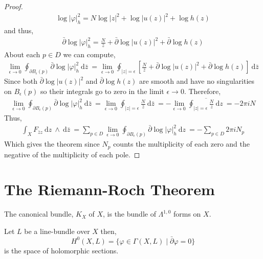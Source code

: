 \documentclass[12pt]{extarticle}
\renewcommand{\d}[1]{\: \mathrm{d}#1 \:}
\theoremstyle{definition}
\newenvironment{definition}[1][Definition:]{\begin{trivlist}
\item[\hskip \labelsep {\bfseries #1}]}{\end{trivlist}}
\begin{document}
\begin{proof}
\begin{align*}
\log{|\varphi|_h^2} = N \log{|z|^2} + \log{|u(z)|^2} + \log{h(z)} 
\end{align*}
and thus,
\begin{align*}
\bar{\partial} \log{|\varphi|_h^2} = \frac{N}{\bar{z}} + \bar{\partial} \log{|u(z)|^2} + \bar{\partial} \log{h(z)} 
\end{align*}
About each $p \in D$ we can compute,
\begin{align*}
\lim_{\epsilon \to 0} \oint_{\partial B_{\epsilon}(p)} \bar{\partial} \log{|\varphi|_h^2} \d{\bar{z}} = \lim_{\epsilon \to 0} \oint_{|z| = \epsilon} \left[ \frac{N}{\bar{z}} + \bar{\partial} \log{|u(z)|^2} + \bar{\partial} \log{h(z)} \right] \d{\bar{z}}
\end{align*}
Since both $\bar{\partial} \log{|u(z)|^2}$ and $\bar{\partial} \log{h(z)}$ are smooth and have no singularities on $B_{\epsilon}(p)$ so their integrals go to zero in the limit $\epsilon \to 0$. Therefore,
\begin{align*}
\lim_{\epsilon \to 0} \oint_{\partial B_{\epsilon}(p)} \bar{\partial} \log{|\varphi|_h^2} \d{\bar{z}} = \lim_{\epsilon \to 0} \oint_{|z| = \epsilon} \frac{N}{\bar{z}} \d{\bar{z}} = -\lim_{\epsilon \to 0} \overline{\oint_{|z| = \epsilon} \frac{N}{z} \d{z} } = - 2 \pi i N
\end{align*}
Thus,
\begin{align*}
\int_X F_{\bar{z} z} \d{z} \wedge \d{\bar{z}} = \sum_{p \in D} \lim_{\epsilon \to 0} \oint_{\partial B_{\epsilon}(p)} \bar{\partial} \log{|\varphi|_h^2} \d{z}  = - \sum_{p \in D} 2 \pi i N_p
\end{align*}
Which gives the theorem since $N_p$ counts the multiplicity of each zero and the negative of the multiplicity of each pole. 
\end{proof}

\section{The Riemann-Roch Theorem}

\begin{definition}
The canonical bundle, $K_X$ of $X$, is the bundle of $\Lambda^{1,0}$ forms on $X$. 
\end{definition}

\begin{definition}
Let $L$ be a line-bundle over $X$ then,
\[ H^0(X, L) = \{ \varphi \in \Gamma(X, L) \mid \bar{\partial} \varphi = 0 \} \]
is the space of holomorphic sections. 
\end{definition}
\end{document}
